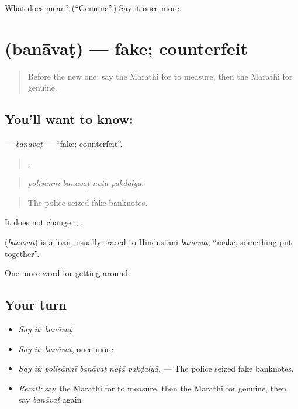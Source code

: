 \begin{tcolorbox}[breakable,colback=teal!4,colframe=teal!35!black,title={Before you move on}]
What does  mean? (\textquotedblleft{}Genuine\textquotedblright{}.) Say it once more.
\end{tcolorbox}
\section[\texorpdfstring{\mr{बनावट} (banāvaṭ)}{बनावट (banāvaṭ)}]{ (banāvaṭ) — fake; counterfeit}

\label{lesson:MR-C425-banavat}



\begin{quote}
Before the new one: say the Marathi for to measure, then the Marathi for genuine.
\end{quote}

\subsection*{You'll want to know: }
\textbf{} — \emph{banāvaṭ} — \textquotedblleft{}fake; counterfeit\textquotedblright{}.

\begin{quote}
   .
\end{quote}

\begin{quote}
\emph{polisānnī banāvaṭ noṭā pakḍalyā.}
\end{quote}

\begin{quote}
The police seized fake banknotes.
\end{quote}

It does not change:  ,  .

\begin{cousinweb}
\textbf{} (\emph{banāvaṭ}) is a loan, usually traced to Hindustani \emph{banāvaṭ}, \textquotedblleft{}make, something put together\textquotedblright{}.
\end{cousinweb}

\begin{grammarlens}[title={What you've built}]
One more word for getting around.
\end{grammarlens}

\subsection*{Your turn}
\begin{itemize}
\raggedright
  \item \emph{Say it:} \emph{banāvaṭ}
  \item \emph{Say it:} \emph{banāvaṭ}, once more
  \item \emph{Say it:} \emph{polisānnī banāvaṭ noṭā pakḍalyā.} — The police seized fake banknotes.
  \item \emph{Recall:} say the Marathi for to measure, then the Marathi for genuine, then say \emph{banāvaṭ} again
\end{itemize}

